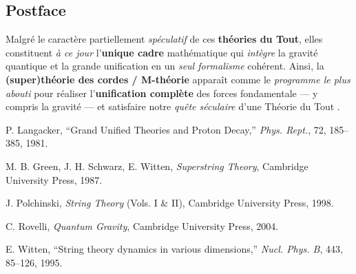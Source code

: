 \documentclass[12pt]{article}
\begin{document}
\subsection*{Postface}
Malgré le caractère partiellement \emph{spéculatif} de ces \textbf{théories du Tout}, 
elles constituent \emph{à ce jour} l'\textbf{unique cadre} mathématique 
qui \emph{intègre} la gravité quantique et la grande unification 
en un \emph{seul formalisme} cohérent.  
Ainsi, la \textbf{(super)théorie des cordes / M-théorie} apparaît 
comme le \emph{programme le plus abouti} pour réaliser l'\textbf{unification complète} 
des forces fondamentale --- y compris la gravité --- 
et satisfaire notre \emph{quête séculaire} d'une \og Théorie du Tout \fg.

\vspace{1em}

\begin{thebibliography}{9}

P. Langacker,
``Grand Unified Theories and Proton Decay,''
\textit{Phys. Rept.}, 72, 185--385, 1981.

M. B. Green, J. H. Schwarz, E. Witten,
\textit{Superstring Theory},
Cambridge University Press, 1987.

J. Polchinski,
\textit{String Theory} (Vols. I \& II),
Cambridge University Press, 1998.

C. Rovelli,
\textit{Quantum Gravity},
Cambridge University Press, 2004.

E. Witten,
``String theory dynamics in various dimensions,''
\textit{Nucl. Phys. B}, 443, 85--126, 1995.

\end{thebibliography}
\end{document}

